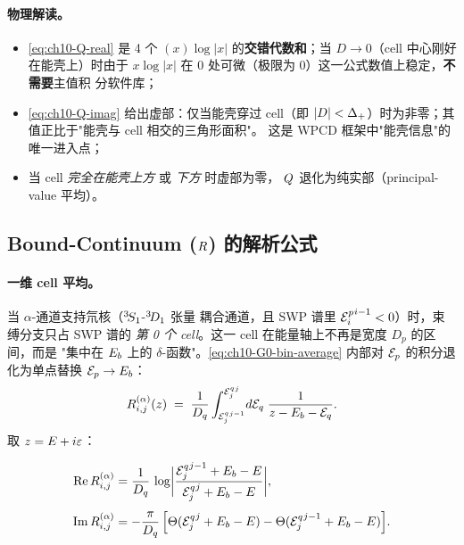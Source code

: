 \paragraph{物理解读。}
\begin{itemize}
  \item \cref{eq:ch10-Q-real} 是 4 个 \((x)\log|x|\) 的\textbf{交错代数和}；当
        \(D \to 0\)（cell 中心刚好在能壳上）时由于 \(x\log|x|\) 在 \(0\)
        处可微（极限为 \(0\)）这一公式数值上稳定，\textbf{不需要}主值积
        分软件库；
  \item \cref{eq:ch10-Q-imag} 给出虚部：仅当能壳穿过 cell（即 \(|D| <
        \Delta_{+}\)）时为非零；其值正比于"能壳与 cell 相交的三角形面积"。
        这是 WPCD 框架中"能壳信息"的唯一进入点；
  \item 当 cell \emph{完全在能壳上方} 或 \emph{下方} 时虚部为零，
        \(Q\) 退化为纯实部（principal-value 平均）。
\end{itemize}

\subsection{Bound-Continuum (\(R\)) 的解析公式}
\label{subsec:ch10-BC}

\paragraph{一维 cell 平均。}
当 \(\alpha\)-通道支持氘核（\({}^{3}\!S_{1}\)-\({}^{3}\!D_{1}\) 张量
耦合通道，且 SWP 谱里 \({\mathcal{E}_{i}^{p}}^{i-1} < 0\)）时，束缚分支只占 SWP 谱的
\emph{第 0 个 cell}。这一 cell 在能量轴上不再是宽度 \(D_p\) 的区间，而是
"集中在 \(E_b\) 上的 \(\delta\)-函数"。\cref{eq:ch10-G0-bin-average} 内部对
\(\mathcal{E}_p\) 的积分退化为单点替换 \(\mathcal{E}_p \to E_b\)：
\begin{equation}
\label{eq:ch10-R-1D-integral}
R_{i,j}^{(\alpha)}(z)
\;=\;
\frac{1}{D_q}
\int_{{\mathcal{E}_{j}^{q}}^{j-1}}^{{\mathcal{E}_{j}^{q}}^{j}}\! d\mathcal{E}_q\;
\frac{1}{z - E_b - \mathcal{E}_q}.
\end{equation}
取 \(z = E + i\varepsilon\)：

\begin{align}
\label{eq:ch10-R-real}
\operatorname{Re} R_{i,j}^{(\alpha)}
&= \frac{1}{D_q}\,
   \log\biggl|\frac{{\mathcal{E}_{j}^{q}}^{j-1} + E_b - E}{{\mathcal{E}_{j}^{q}}^{j} + E_b - E}\biggr|, \\[4pt]
\label{eq:ch10-R-imag}
\operatorname{Im} R_{i,j}^{(\alpha)}
&= -\frac{\pi}{D_q}\,
\Bigl[
   \Theta({\mathcal{E}_{j}^{q}}^{j} + E_b - E)
- \Theta({\mathcal{E}_{j}^{q}}^{j-1} + E_b - E)
\Bigr].
\end{align}

